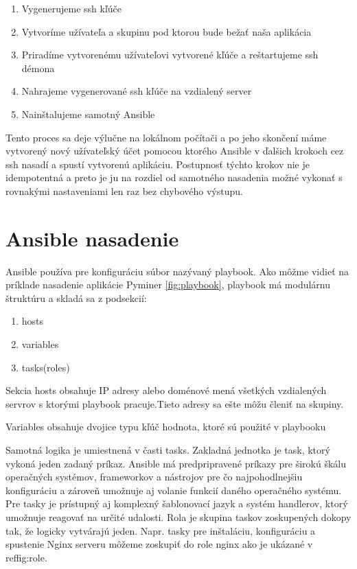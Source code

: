 \begin{enumerate}
  \item Vygenerujeme ssh kľúče
  \item Vytvoríme užívateľa a skupinu pod ktorou bude bežať naša aplikácia
  \item Priradíme vytvorenému užívateľovi vytvorené kľúče a reštartujeme ssh démona
  \item Nahrajeme vygenerované ssh kľúče na vzdialený server
  \item Nainštalujeme samotný Ansible
\end{enumerate}

Tento proces sa deje výlučne na lokálnom počítači a po jeho skončení máme vytvorený nový užívateľský účet pomocou ktorého Ansible v ďalšich krokoch cez ssh nasadí a spustí vytvorenú aplikáciu. Postupnosť týchto krokov nie je idempotentná a preto je ju na rozdiel od samotného nasadenia  možné vykonať s rovnakými nastaveniami len raz bez chybového výstupu.

\section{Ansible nasadenie}
Ansible používa pre konfiguráciu súbor nazývaný playbook.  Ako môžme vidieť na príklade nasadenie aplikácie Pyminer \ref{fig:playbook},  playbook má modulárnu štruktúru a skladá sa z podsekcií:

\begin{enumerate}
  \item hosts
  \item variables
  \item tasks(roles)
\end{enumerate}

\par Sekcia hosts obsahuje IP adresy alebo doménové mená všetkých vzdialených servrov s ktorými playbook pracuje.Tieto adresy sa ešte môžu členiť na skupiny.
\par Variables obsahuje dvojice typu kľúč hodnota, ktoré sú použité v playbooku
\par Samotná logika je umiestnená v časti tasks. Zakladná jednotka je task, ktorý vykoná jeden zadaný príkaz. Ansible má predpripravené príkazy pre širokú škálu operačných systémov, frameworkov a nástrojov pre čo najpohodlnejšiu konfiguráciu a zároveň umožnuje aj volanie funkcií daného operačného systému. Pre tasky je prístupný aj komplexný šablonovací jazyk a systém handlerov, ktorý umožnuje reagovať na určité udalosti.  Rola je skupina taskov zoskupených dokopy tak, že logicky vytvárajú jeden. Napr. tasky pre inštaláciu, konfiguráciu a spustenie Nginx serveru môžeme zoskupiť do role nginx ako je ukázané v ref{fig:role}. 

